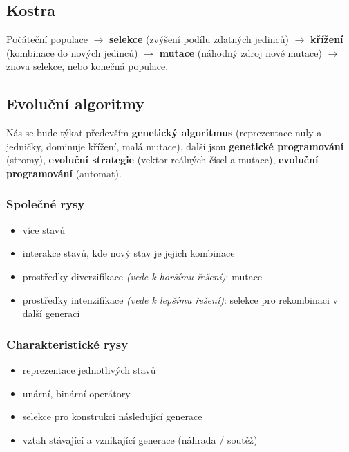 \subsection{Kostra}

Počáteční populace $\to$ \textbf{selekce} (zvýšení podílu zdatných jedinců) $\to$ \textbf{křížení} (kombinace do nových jedinců) $\to$ \textbf{mutace} (náhodný zdroj nové mutace) $\to$ znova selekce, nebo konečná populace.

\subsection{Evoluční algoritmy}

Nás se bude týkat především \textbf{genetický algoritmus} (reprezentace nuly a jedničky, dominuje křížení, malá mutace), další jsou \textbf{genetické programo\-vání} (stromy), \textbf{evoluční strategie} (vektor reálných čísel a mutace), \textbf{evoluční programování} (automat).

\newpage
\subsubsection*{Společné rysy}

\begin{itemize}
    \item více stavů
    \item interakce stavů, kde nový stav je jejich kombinace
    \item prostředky diverzifikace \textit{(vede k horšímu řešení)}: mutace
    \item prostředky intenzifikace \textit{(vede k lepšímu řešení)}: selekce pro rekombinaci v další generaci
\end{itemize}

\subsubsection*{Charakteristické rysy}

\begin{itemize}
    \item reprezentace jednotlivých stavů
    \item unární, binární operátory
    \item selekce pro konstrukci následující generace
    \item vztah stávající a vznikající generace (náhrada / soutěž)
\end{itemize}

